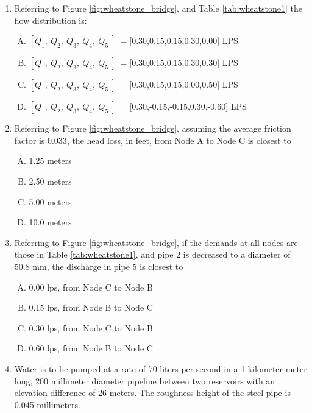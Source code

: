 \documentclass[11pt]{article}
\begin{document}
\begin{enumerate}



\item Referring to Figure \ref{fig:wheatstone_bridge}, and Table \ref{tab:wheatstone1} the flow distribution is:
\begin{enumerate}[(A)]
\item $[Q_1,~Q_2,~Q_3,~Q_4,~Q_5~]~=$[0.30,0.15,0.15,0.30,0.00] LPS
\item $[Q_1,~Q_2,~Q_3,~Q_4,~Q_5~]~=$[0.30,0.15,0.15,0.30,0.30] LPS
\item $[Q_1,~Q_2,~Q_3,~Q_4,~Q_5~]~=$[0.30,0.15,0.15,0.00,0.50] LPS
\item $[Q_1,~Q_2,~Q_3,~Q_4,~Q_5~]~=$[0.30,-0.15,-0.15,0.30,-0.60] LPS
\end{enumerate}
\item Referring to Figure \ref{fig:wheatstone_bridge}, assuming the average friction factor is $0.033$, the head loss, in feet, from Node A to Node C is closest to
\begin{enumerate}[(A)]
\item 1.25 meters 
\item 2.50 meters
\item 5.00 meters
\item 10.0 meters
\end{enumerate}
\item Referring to Figure \ref{fig:wheatstone_bridge}, if the demands at all nodes are those in Table \ref{tab:wheatstone1}, and pipe 2 is decreased to a diameter of 50.8 mm, the discharge in pipe 5 is closest to
\begin{enumerate}[(A)]
\item 0.00 lps, from Node C to Node B  %
\item 0.15 lps, from Node B to Node C
\item 0.30 lps, from Node C to Node B
\item 0.60 lps, from Node B to Node C
\end{enumerate}
\clearpage
\item Water is to be pumped at a rate of 70 liters per second in a 1-kilometer meter long, 200 millimeter diameter pipeline between two reservoirs with an elevation difference of 26 meters.  The roughness height of the steel pipe is 0.045 millimeters.   


\end{enumerate}
\end{document}
